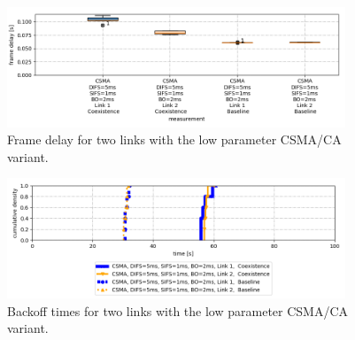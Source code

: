 \begin{figure}[b]
	\label{fig:results-csma-low-dbl-frame-delay}
	\begin{center}
		\includegraphics[width=0.9\textwidth]{pictures/results/same_combinations/csma_low_params/frame_delay_boxplot}
	\end{center}
	\caption{Frame delay for two links with the low parameter CSMA/CA variant.}
\end{figure}

\begin{figure}[bt]
	\label{fig:results-csma-low-dbl-backoff}
	\begin{center}
		\includegraphics[width=0.9\textwidth]{pictures/results/same_combinations/csma_low_params/backoff_(joint)_sum_cdf}
	\end{center}
	\caption{Backoff times for two links with the low parameter CSMA/CA variant.}
\end{figure}


